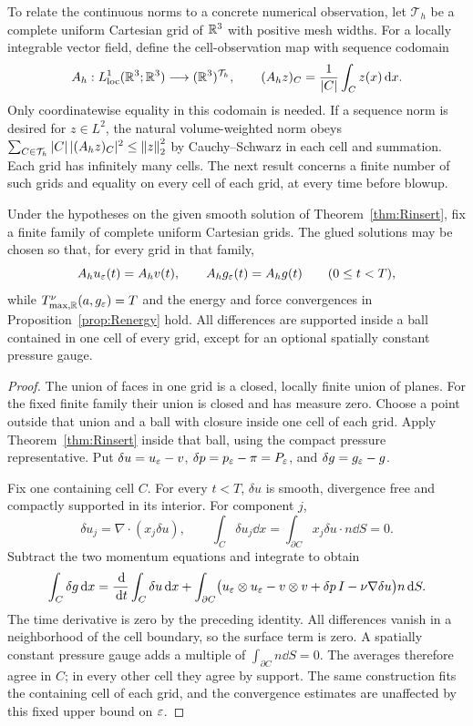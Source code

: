To relate the continuous norms to a concrete numerical observation, let $\mathcal T_h$ be a complete uniform Cartesian grid of $\mathbb R^3$ with positive mesh widths. For a locally integrable vector field, define the cell-observation map with sequence codomain
\[
 A_h:L^1_{\mathrm{loc}}(\mathbb R^3;\mathbb R^3)\longrightarrow(\mathbb R^3)^{\mathcal T_h},
 \qquad (A_hz)_C=\frac1{|C|}\int_Cz(x)\,\mathrm d x.
\]
Only coordinatewise equality in this codomain is needed. If a sequence norm is desired for $z\in L^2$, the natural volume-weighted norm obeys
$\sum_{C\in\mathcal T_h}|C|\,|(A_hz)_C|^2\le\left\lVert z\right\rVert_2^2$
by Cauchy--Schwarz in each cell and summation. Each grid has infinitely many cells. The next result concerns a finite number of such grids and equality on every cell of each grid, at every time before blowup.

\begin{theorem}\label{thm:Rgrid}
Under the hypotheses on the given smooth solution of Theorem~\ref{thm:Rinsert}, fix a finite family of complete uniform Cartesian grids. The glued solutions may be chosen so that, for every grid in that family,
\[
 A_hu_\varepsilon(t)=A_hv(t),\qquad A_hg_\varepsilon(t)=A_hg(t)
 \qquad(0\le t<T),
\]
while $T^\nu_{\max,\mathbb R}(a,g_\varepsilon)=T$ and the energy and force convergences in Proposition~\ref{prop:Renergy} hold. All differences are supported inside a ball contained in one cell of every grid, except for an optional spatially constant pressure gauge.
\end{theorem}
\begin{proof}
The union of faces in one grid is a closed, locally finite union of planes. For the fixed finite family their union is closed and has measure zero. Choose a point outside that union and a ball with closure inside one cell of each grid. Apply Theorem~\ref{thm:Rinsert} inside that ball, using the compact pressure representative. Put $\delta u=u_\varepsilon-v$, $\delta p=p_\varepsilon-\pi=P_\varepsilon$, and $\delta g=g_\varepsilon-g$.

Fix one containing cell $C$. For every $t<T$, $\delta u$ is smooth, divergence free and compactly supported in its interior. For component $j$,
\[
 \delta u_j=\nabla\cdot(x_j\delta u),\qquad
 \int_C\delta u_j\dd x=\int_{\partial C}x_j\delta u\cdot n\dd S=0.
\]
Subtract the two momentum equations and integrate to obtain
\begin{equation}\label{eq:gridforce}
 \int_C\delta g\,\mathrm d x
 =\frac{\,\mathrm d}{\,\mathrm d t}\int_C\delta u\,\mathrm d x
 +\int_{\partial C}\bigl(u_\varepsilon\otimes u_\varepsilon-v\otimes v
                         +\delta p\,I-\nu\nabla\delta u\bigr)n\,\mathrm d S.
\end{equation}
The time derivative is zero by the preceding identity. All differences vanish in a neighborhood of the cell boundary, so the surface term is zero. A spatially constant pressure gauge adds a multiple of $\int_{\partial C}n\dd S=0$. The averages therefore agree in $C$; in every other cell they agree by support. The same construction fits the containing cell of each grid, and the convergence estimates are unaffected by this fixed upper bound on $\varepsilon$.
\end{proof}

